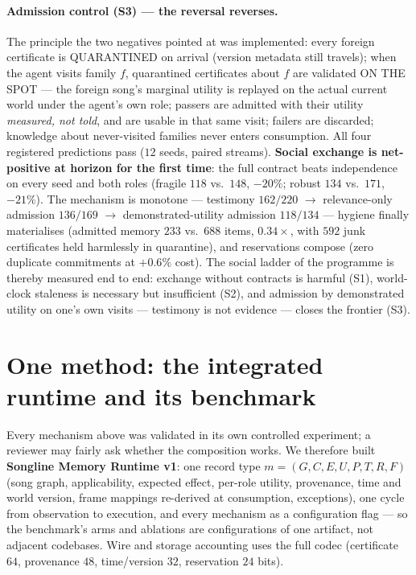 \documentclass{article}
\begin{document}
\paragraph{Admission control (S3) --- the reversal reverses.} The
principle the two negatives pointed at was implemented: every foreign
certificate is QUARANTINED on arrival (version metadata still
travels); when the agent visits family $f$, quarantined certificates
about $f$ are validated ON THE SPOT --- the foreign song's marginal
utility is replayed on the actual current world under the agent's own
role; passers are admitted with their utility \emph{measured, not
told}, and are usable in that same visit; failers are discarded;
knowledge about never-visited families never enters consumption. All
four registered predictions pass ($12$ seeds, paired streams).
\textbf{Social exchange is net-positive at horizon for the first
time}: the full contract beats independence on every seed and both
roles (fragile $118$ vs.\ $148$, $-20\%$; robust $134$ vs.\ $171$,
$-21\%$). The mechanism is monotone --- testimony $162/220$ $\to$
relevance-only admission $136/169$ $\to$ demonstrated-utility
admission $118/134$ --- hygiene finally materialises (admitted
memory $233$ vs.\ $688$ items, $0.34\times$, with $592$ junk
certificates held harmlessly in quarantine), and reservations compose
(zero duplicate commitments at $+0.6\%$ cost). The social ladder of
the programme is thereby measured end to end: exchange without
contracts is harmful (S1), world-clock staleness is necessary but
insufficient (S2), and admission by demonstrated utility on one's own
visits --- testimony is not evidence --- closes the frontier (S3).


\section{One method: the integrated runtime and its benchmark}
\label{p5:sec:integration}

Every mechanism above was validated in its own controlled experiment;
a reviewer may fairly ask whether the composition works. We therefore
built \textbf{Songline Memory Runtime v1}: one record type $m = (G,
C, E, U, P, T, R, F)$ (song graph, applicability, expected effect,
per-role utility, provenance, time and world version, frame mappings
re-derived at consumption, exceptions), one cycle from observation to
execution, and every mechanism as a configuration flag --- so the
benchmark's arms and ablations are configurations of one artifact,
not adjacent codebases. Wire and storage accounting uses the full
codec (certificate $64$, provenance $48$, time/version $32$,
reservation $24$ bits).
\end{document}
